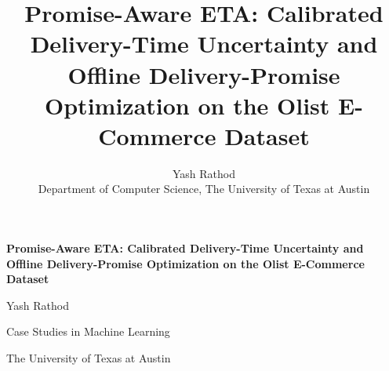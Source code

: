 \documentclass[12pt]{article}
\title{Promise-Aware ETA: Calibrated Delivery-Time Uncertainty and Offline Delivery-Promise Optimization on the Olist E-Commerce Dataset}
\author{Yash Rathod\\[4pt]
\small Department of Computer Science, The University of Texas at Austin}
\date{} %
\begin{document}
\onehalfspacing

\begin{titlepage}
  \centering
  \vspace*{3cm}
  {\bfseries\Large Promise-Aware ETA: Calibrated Delivery-Time Uncertainty and Offline Delivery-Promise Optimization on the Olist E-Commerce Dataset\par}
  \vspace{2cm}
  {\large Yash Rathod\par}
  \vspace{0.5cm}
  {\large Case Studies in Machine Learning\par}
  {\large The University of Texas at Austin\par}
  \vspace{2cm}
  \vfill
\end{titlepage}
\end{document}
